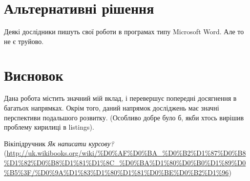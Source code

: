 \documentclass[a4paper,14pt]{extreport}
\begin{document}
	
	\chapter{Альтернативні рішення} 
	Деякі дослідники пишуть свої роботи в програмах типу Microsoft Word. Але то не є труйово\cite{howto}.	
	
	\chapter{Висновок} 
	Дана робота містить значний мій вклад, і перевершує попередні досягнення в багатьох напрямках. Окрім того, даний напрямок досліджень має значні перспективи
	подальшого розвитку. (Особливо добре було б, якби хтось вирішив проблему кирилиці в listings).
		
	\newpage
	\begin{thebibliography}{9}
		
		 Вікіпідручник \emph{Як написати курсову?}
		(\url{http://uk.wikibooks.org/wiki/%D0%AF%D0%BA_%D0%B2%D1%87%D0%B8%D1%82%D0%B8%D1%81%D1%8C_%D0%BA%D1%80%D0%B0%D1%89%D0%B5%3F/%D0%9A%D1%83%D1%80%D1%81%D0%BE%D0%B2%D1%96})
			
		\end{thebibliography}
	
\end{document}
